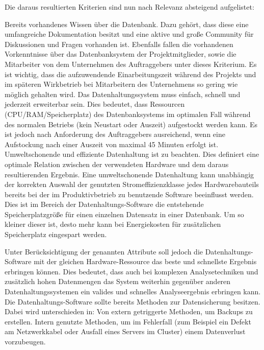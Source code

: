 Die daraus resultierten Kriterien sind nun nach Relevanz absteigend
aufgelistet:
\begin{outline}
  \1 Bereits vorhandenes Wissen über die Datenbank. Dazu gehört, dass diese
  eine umfangreiche Dokumentation besitzt und eine aktive und große Community
  für Diskussionen und Fragen vorhanden ist. Ebenfalls fallen die vorhandenen
  Vorkenntnisse über das Datenbanksystem der Projektmitglieder, sowie die
  Mitarbeiter von dem Unternehmen des Auftraggebers unter dieses Kriterium. Es
  ist wichtig, dass die aufzuwendende Einarbeitungszeit während des Projekts
  und im späteren Wirkbetrieb bei Mitarbeitern des Unternehmens so gering wie
  möglich gehalten wird.
  \1 Das Datenhaltungssystem muss einfach, schnell und jederzeit erweiterbar
  sein. Dies bedeutet, dass Ressourcen (CPU/RAM/Speicherplatz) des
  Datenbanksystems im optimalen Fall während des normalen Betriebs (kein
  Neustart oder Auszeit) aufgestockt werden kann. Es ist jedoch nach
  Anforderung des Auftraggebers ausreichend, wenn eine Aufstockung nach einer
  Auszeit von maximal 45 Minuten erfolgt ist.
  \1 Umweltschonende und effiziente Datenhaltung ist zu beachten. Dies
  definiert eine optimale Relation zwischen der verwendeten Hardware und dem
  daraus resultierenden Ergebnis. Eine umweltschonende Datenhaltung kann
  unabhängig der korrekten Auswahl der genutzten Stromeffizienzklasse jedes
  Hardwarebauteils bereits bei der im Produktivbetrieb zu benutzende Software
  beeinflusst werden. Dies ist im Bereich der Datenhaltungs-Software die
  entstehende Speicherplatzgröße für einen einzelnen Datensatz in einer
  Datenbank. Um so kleiner dieser ist, desto mehr kann bei Energiekosten für
  zusätzlichen Speicherplatz eingespart werden.

  Unter Berücksichtigung der genannten Attribute soll jedoch die
  Datenhaltungs-Software mit der gleichen Hardware-Ressource das beste und
  schnellste Ergebnis erbringen können. Dies bedeutet, dass auch bei komplexen
  Analysetechniken und zusätzlich hohen Datenmengen das System weiterhin
  gegenüber anderen Datenhaltungssystemen ein valides und schnelles
  Analyseergebnis erbringen kann.
  \1 Die Datenhaltungs-Software sollte bereits Methoden zur Datensicherung
  besitzen. Dabei wird unterschieden in:
    \2 Von extern getriggerte Methoden, um Backups zu erstellen.
    \2 Intern genutzte Methoden, um im Fehlerfall (zum Beispiel ein Defekt am
    Netzwerkkabel oder Ausfall eines Servers im Cluster) einem Datenverlust
    vorzubeugen.
\end{outline}
\nl%

